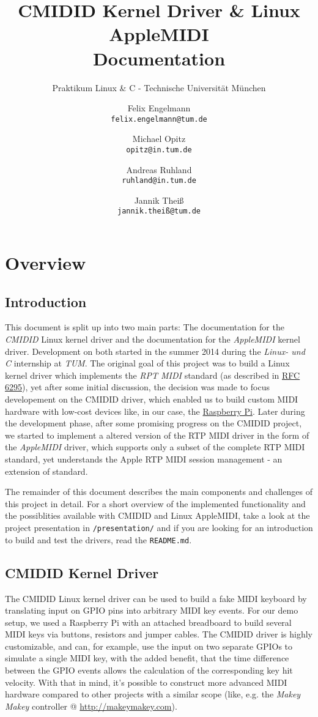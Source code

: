 \documentclass[paper=a4,fontsize=11pt,twocolumn,pagesize,bibtotoc]{scrartcl}
\title{CMIDID Kernel Driver \& Linux AppleMIDI\\Documentation}
\subtitle{Praktikum Linux \& C - Technische Universität München}
\author{
Felix Engelmann\\ \texttt{felix.engelmann@tum.de}
\and
Michael Opitz\\ \texttt{opitz@in.tum.de}
\and
Andreas Ruhland\\ \texttt{ruhland@in.tum.de}
\and
Jannik Theiß\\ \texttt{jannik.theiß@tum.de}
}
\begin{document}
\maketitle

\section{Overview}
\label{documentation:overview}

\subsection{Introduction}
\label{overview:intro}

This document is split up into two main parts: The documentation for the 
\emph{CMIDID} Linux kernel driver and the documentation for the 
\emph{AppleMIDI} kernel driver. Development on both started in the summer 
2014 during the \emph{Linux- und C} internship at \emph{TUM}. The original 
goal of this project was to build a Linux kernel driver which implements 
the \emph{RPT MIDI} standard (as described in 
\href{http://tools.ietf.org/html/rfc6295}{RFC 6295}), yet after some initial 
discussion, the decision was made to focus developement on the CMIDID driver, 
which enabled us to build custom MIDI hardware with low-cost devices like, in 
our case, the \href{www.raspberrypi.org}{Raspberry Pi}. Later during the 
development phase, after some promising progress on the CMIDID project, we 
started to implement a altered version of the RTP MIDI driver in the 
form of the \emph{AppleMIDI} driver, which supports only a subset of the 
complete RTP MIDI standard, yet understands the Apple RTP MIDI session 
management - an extension of standard.

The remainder of this document describes the main components and challenges 
of this project in detail. For a short overview of the implemented 
functionality and the possiblities available with CMIDID and Linux AppleMIDI, 
take a look at the project presentation in \texttt{/presentation/} and if 
you are looking for an introduction to build and test the drivers, read the 
\texttt{README.md}.

\subsection{CMIDID Kernel Driver}
\label{overview:cmidid}

The CMIDID Linux kernel driver can be used to build a fake MIDI keyboard 
by translating input on GPIO pins into arbitrary MIDI key events. For our 
demo setup, we used a Raspberry Pi with an attached breadboard to build
several MIDI keys via buttons, resistors and jumper cables. The CMIDID driver 
is highly customizable, and can, for example, use the input on two separate 
GPIOs to simulate a single MIDI key, with the added benefit, that the time 
difference between the GPIO events allows the calculation of the corresponding 
key hit velocity. With that in mind, it's possible to construct more advanced 
MIDI hardware compared to other projects with a similar scope (like, e.g. the 
\emph{Makey Makey} controller @ \url{http://makeymakey.com}).
\end{document}
